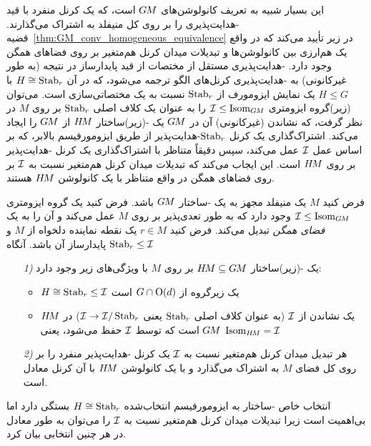 این بسیار شبیه به تعریف کانولوشن‌های $G\mkern-1.4muM$ است، که یک کرنل منفرد با قید -هدایت‌پذیری را بر روی کل منیفلد به اشتراک می‌گذارند.
قضیه~\ref{thm:GM_conv_homogeneous_equivalence} در زیر تأیید می‌کند که در واقع یک هم‌ارزی بین کانولوشن‌ها و تبدیلات میدان کرنل هم‌متغیر بر روی فضاهای همگن وجود دارد.
-هدایت‌پذیری مستقل از مختصات از قید پایدارساز در نتیجه (به طور غیرکانونی) به -هدایت‌پذیری کرنل‌های الگو ترجمه می‌شود، که در آن $H \cong \operatorname{Stab}_{r}$ با $H\leq G$ یک نمایش ایزومورف از $\operatorname{Stab}_{r}$ نسبت به یک مختصاتی‌سازی است.
می‌توان (زیر)گروه ایزومتری $\mathcal{I} \leq \operatorname{Isom}_{G\mkern-1.4muM}$ را به عنوان یک کلاف اصلی $\operatorname{Stab}_{r}$ بر روی $M$ در نظر گرفت، که نشاندن (غیرکانونی) آن در $G\mkern-1.4muM$ یک -(زیر)ساختار $H\mkern-2.5muM$ از $G\mkern-1.4muM$ را ایجاد می‌کند.
اشتراک‌گذاری یک کرنل $\operatorname{Stab}_{r}$-هدایت‌پذیر از طریق ایزومورفیسم بالابر، که بر اساس عمل $\mathcal{I}$ عمل می‌کند،
سپس دقیقاً متناظر با اشتراک‌گذاری یک کرنل -هدایت‌پذیر بر روی $H\mkern-2.5muM$ است.
این ایجاب می‌کند که تبدیلات میدان کرنل هم‌متغیر نسبت به $\mathcal{I}$ بر روی فضاهای همگن در واقع متناظر با یک کانولوشن $H\mkern-2.5muM$ هستند.
\begin{thm}
\label{thm:GM_conv_homogeneous_equivalence}
    فرض کنید $M$ یک منیفلد مجهز به یک -ساختار $G\mkern-1.4muM$ باشد.
    فرض کنید یک گروه ایزومتری $\mathcal{I} \leq \operatorname{Isom}_{G\mkern-1.4muM}$ وجود دارد که به طور تعدی‌پذیر بر روی $M$ عمل می‌کند و آن را به یک \emph{فضای همگن} تبدیل می‌کند.
    فرض کنید $r\in M$ یک نقطه نماینده دلخواه از $M$ و $\operatorname{Stab}_{r} \leq \mathcal{I}$ پایدارساز آن باشد.
    آنگاه
    \begin{itemize}
        \item[\textit{1)}] یک -(زیر)ساختار $H\mkern-2.5muM \subseteq G\mkern-1.4muM$ بر روی $M$ با ویژگی‌های زیر وجود دارد:
            \begin{itemize}\setlength\itemsep{1ex}
                \item $H \cong \operatorname{Stab}_{r} \leq \mathcal{I}$ یک زیرگروه از $G \cap \operatorname{O}(d)$ است
                \item $H\mkern-2.5muM$ یک نشاندن از $\mathcal{I}$ (به عنوان کلاف اصلی $\operatorname{Stab}_{r}$ یعنی $\mathcal{I} \to \mathcal{I}/\operatorname{Stab}_{r}$) در $G\mkern-1.4muM$ است که توسط $\mathcal{I}$ حفظ می‌شود، یعنی $\operatorname{Isom}_{H\mkern-2.5muM} = \mathcal{I}$
            \end{itemize}
        \item[\textit{2)}] هر تبدیل میدان کرنل هم‌متغیر نسبت به $\mathcal{I}$ یک کرنل -هدایت‌پذیر منفرد را بر روی کل فضای $M$ به اشتراک می‌گذارد و با یک کانولوشن $H\mkern-2.5muM$ با آن کرنل معادل است.
    \end{itemize}
    انتخاب خاص -ساختار به ایزومورفیسم انتخاب‌شده $H \cong \operatorname{Stab}_{r}$ بستگی دارد اما بی‌اهمیت است زیرا تبدیلات میدان کرنل هم‌متغیر نسبت به $\mathcal{I}$ را می‌توان به طور معادل در هر چنین انتخابی بیان کرد.
\end{thm}
